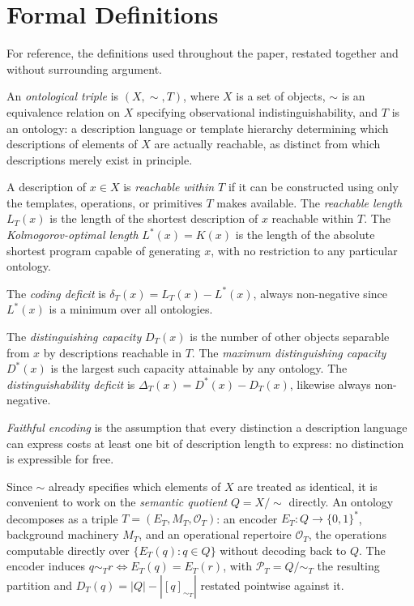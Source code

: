 \documentclass[11pt]{article}
\theoremstyle{plain}
\begin{document}
\newpage
\appendix

\section{Formal Definitions}
\label{app:definitions}

For reference, the definitions used throughout the paper, restated together and without surrounding argument.

An \emph{ontological triple} is $(X,\sim,T)$, where $X$ is a set of objects, $\sim$ is an equivalence relation on $X$ specifying observational indistinguishability, and $T$ is an ontology: a description language or template hierarchy determining which descriptions of elements of $X$ are actually reachable, as distinct from which descriptions merely exist in principle.

A description of $x \in X$ is \emph{reachable within $T$} if it can be constructed using only the templates, operations, or primitives $T$ makes available. The \emph{reachable length} $L_T(x)$ is the length of the shortest description of $x$ reachable within $T$. The \emph{Kolmogorov-optimal length} $L^*(x) = K(x)$ is the length of the absolute shortest program capable of generating $x$, with no restriction to any particular ontology.

The \emph{coding deficit} is $\delta_T(x) = L_T(x) - L^*(x)$, always non-negative since $L^*(x)$ is a minimum over all ontologies.

The \emph{distinguishing capacity} $D_T(x)$ is the number of other objects separable from $x$ by descriptions reachable in $T$. The \emph{maximum distinguishing capacity} $D^*(x)$ is the largest such capacity attainable by any ontology. The \emph{distinguishability deficit} is $\Delta_T(x) = D^*(x) - D_T(x)$, likewise always non-negative.

\emph{Faithful encoding} is the assumption that every distinction a description language can express costs at least one bit of description length to express: no distinction is expressible for free.

Since $\sim$ already specifies which elements of $X$ are treated as identical, it is convenient to work on the \emph{semantic quotient} $Q = X/\!\sim$ directly. An ontology decomposes as a triple $T = (E_T, M_T, \mathcal{O}_T)$: an encoder $E_T : Q \to \{0,1\}^*$, background machinery $M_T$, and an operational repertoire $\mathcal{O}_T$, the operations computable directly over $\{E_T(q):q\in Q\}$ without decoding back to $Q$. The encoder induces $q \sim_T r \iff E_T(q) = E_T(r)$, with $\mathcal{P}_T = Q/\!\sim_T$ the resulting partition and $D_T(q) = |Q| - |[q]_{\sim_T}|$ restated pointwise against it.
\end{document}
